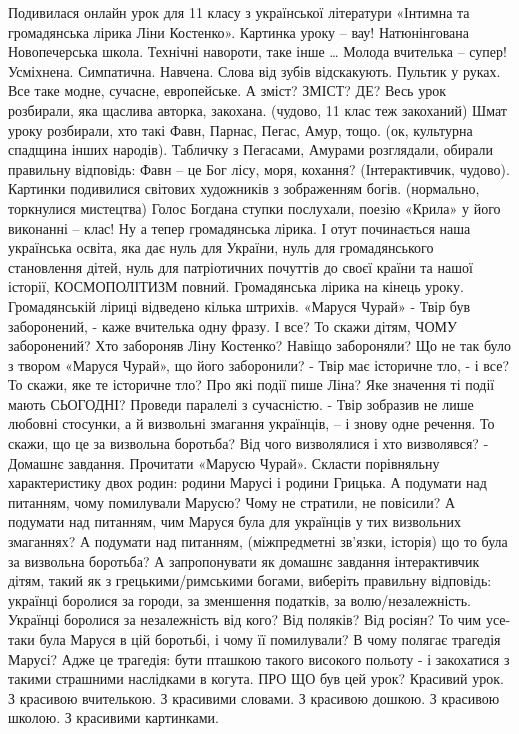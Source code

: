 Подивилася онлайн урок для 11 класу з української літератури «Інтимна та громадянська лірика Ліни Костенко».
Картинка уроку – вау! Натюнінгована Новопечерська школа. Технічні навороти, таке інше …
Молода вчителька – супер! Усміхнена. Симпатична. Навчена. Слова від зубів відскакують. Пультик у руках.
Все таке модне, сучасне, европейське.
А зміст?
ЗМІСТ? ДЕ?
Весь урок розбирали, яка щаслива авторка, закохана. (чудово, 11 клас теж закоханий)
Шмат уроку розбирали, хто такі Фавн, Парнас, Пегас, Амур, тощо. (ок, культурна спадщина інших народів). Табличку з Пегасами, Амурами розглядали, обирали правильну відповідь: Фавн – це Бог лісу, моря, кохання? (Інтерактивчик, чудово).
Картинки подивилися світових художників з зображенням богів. (нормально, торкнулися мистецтва)
Голос Богдана ступки послухали, поезію «Крила» у його виконанні – клас!
Ну а тепер громадянська лірика. І отут починається наша українська освіта, яка дає нуль для України, нуль для громадянського становлення дітей, нуль для патріотичних почуттів до своєї країни та нашої історії, КОСМОПОЛІТИЗМ повний.
Громадянська лірика на кінець уроку. Громадянській ліриці відведено кілька штрихів. «Маруся Чурай»
- Твір був заборонений, - каже вчителька одну фразу. І все?
То скажи дітям, ЧОМУ заборонений? Хто забороняв Ліну Костенко? Навіщо забороняли? Що не так було з твором «Маруся Чурай», що його заборонили?
- Твір має історичне тло, - і все?
То скажи, яке те історичне тло? Про які події пише Ліна? Яке значення ті події мають СЬОГОДНІ? Проведи паралелі з сучасністю.
- Твір зобразив не лише любовні стосунки, а й визвольні змагання українців, – і знову одне речення.
То скажи, що це за визвольна боротьба? Від чого визволялися і хто визволявся?
- Домашнє завдання. Прочитати «Марусю Чурай». Скласти порівняльну характеристику двох родин: родини Марусі і родини Грицька.
А подумати над питанням, чому помилували Марусю? Чому не стратили, не повісили?
А подумати над питанням, чим Маруся була для українців у тих визвольних змаганнях?
А подумати над питанням, (міжпредметні зв’язки, історія) що то була за визвольна боротьба?
А запропонувати як домашнє завдання інтерактивчик дітям, такий як з грецькими/римськими богами, виберіть правильну відповідь: українці боролися за городи, за зменшення податків, за волю/незалежність. Українці боролися за незалежність від кого? Від поляків? Від росіян?
То чим усе-таки була Маруся в цій боротьбі, і чому її помилували? В чому полягає трагедія Марусі? Адже це трагедія: бути пташкою такого високого польоту - і закохатися з такими страшними наслідками в когута.
ПРО ЩО був цей урок? Красивий урок. З красивою вчителькою. З красивими словами. З красивою дошкою. З красивою школою. З красивими картинками.
